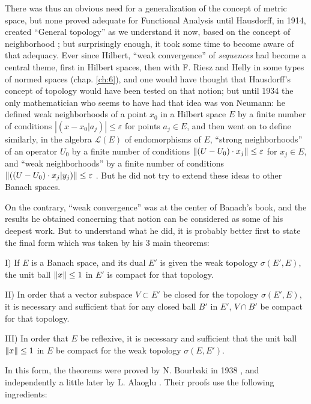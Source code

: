 \documentclass[12pt,a4paper,leqno,twoside]{extbook}
\DeclarePairedDelimiter{\norm}{\lVert}{\rVert}
\begin{document}
There was thus an obvious need for a generalization of the concept of metric space, but none proved adequate for Functional Analysis until Hausdorff, in 1914, created ``General topology'' as we understand it now, based on the concept of neighborhood \cite{100}; but surprisingly enough, it took some time to become aware of that adequacy. Ever since Hilbert, ``weak convergence'' of \emph{sequences} had become a central theme, first in Hilbert spaces, then with F. Riesz and Helly in some types of normed spaces (chap. \ref{ch:6}), and one would have thought that Hausdorff's concept of topology would have been tested on that notion; but until 1934 the only mathematician who seems to have had that idea was von Neumann: he defined weak neighborhoods of a point \(x_0\) in a Hilbert space \(E\) by a finite number of conditions \(|\left(x-x_0|a_j\right)| \leq \varepsilon\) for points \(a_j \in E\), and then went on to define similarly, in the algebra \(\mathcal{L}(E)\) of endomorphisms of \(E\), ``strong neighborhoods'' of an operator \(U_0\) by a finite number of conditions \(\norm{(U-U_0) \cdot x_j} \leq \varepsilon\) for \(x_j \in E\), and ``weak neighborhoods'' by a finite number of conditions \(\norm{\left( (U-U_0) \cdot x_j | y_j \right)} \leq \varepsilon\) \cite[vol.~II, p.~94--104]{221}. But he did not try to extend these ideas to other Banach spaces.

On the contrary, ``weak convergence'' was at the center of Banach's book, and the results he obtained concerning that notion can be considered as some of his deepest work. But to understand what he did, it is probably better first to state the final form which was taken by his 3 main theorems:

I) If \(E\) is a Banach space, and its dual \(E'\) is given the weak topology \(\sigma(E',E)\), the unit ball \(\norm{x} \leq 1\) in \(E'\) is compact for that topology.

II) In order that a vector subspace \(V \subset E'\) be closed for the topology \(\sigma(E',E)\), it is necessary and sufficient that for any closed ball \(B'\) in \(E'\), \(V \cap B'\) be compact for that topology.

III) In order that \(E\) be reflexive, it is necessary and sufficient that the unit ball \(\norm{x} \leq 1\) in \(E\) be compact for the weak topology \(\sigma(E,E')\).

In this form, the theorems were proved by N. Bourbaki in 1938 \cite{025}, and independently a little later by L. Alaoglu \cite{005}. Their proofs use the following ingredients:
\end{document}
